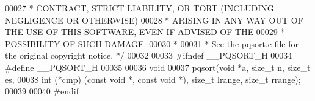 \begin{DoxyCode}
00027 \textcolor{comment}{ * CONTRACT, STRICT LIABILITY, OR TORT (INCLUDING NEGLIGENCE OR OTHERWISE)}
00028 \textcolor{comment}{ * ARISING IN ANY WAY OUT OF THE USE OF THIS SOFTWARE, EVEN IF ADVISED OF THE}
00029 \textcolor{comment}{ * POSSIBILITY OF SUCH DAMAGE.}
00030 \textcolor{comment}{ *}
00031 \textcolor{comment}{ * See the pqsort.c file for the original copyright notice. */}
00032 
00033 \textcolor{preprocessor}{#}\textcolor{preprocessor}{ifndef} \textcolor{preprocessor}{\_\_PQSORT\_H}
00034 \textcolor{preprocessor}{#}\textcolor{preprocessor}{define} \textcolor{preprocessor}{\_\_PQSORT\_H}
00035 
00036 \textcolor{keywordtype}{void}
00037 pqsort(\textcolor{keywordtype}{void} *a, size\_t n, size\_t es,
00038     \textcolor{keywordtype}{int} (*cmp) (\textcolor{keyword}{const} \textcolor{keywordtype}{void} *, \textcolor{keyword}{const} \textcolor{keywordtype}{void} *), size\_t lrange, size\_t rrange);
00039 
00040 \textcolor{preprocessor}{#}\textcolor{preprocessor}{endif}
\end{DoxyCode}
